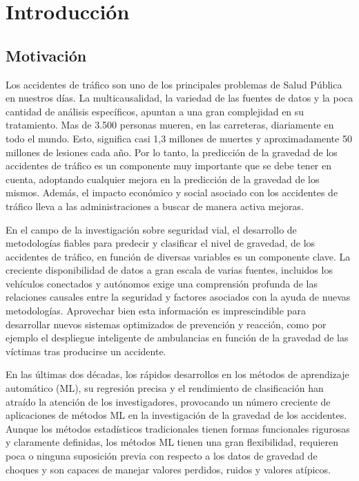 
\chapter{Introducción}

\section {Motivación}


	Los accidentes de tráﬁco son uno de los principales problemas de Salud Pública en nuestros días. La multicausalidad, la variedad de las fuentes de datos y la poca cantidad de análisis especíﬁcos, apuntan a una gran complejidad en su tratamiento. Mas de 3.500 personas mueren, en las carreteras, diariamente en todo el mundo. Esto, signiﬁca casi 1,3 millones de muertes y aproximadamente 50 millones de lesiones cada año. Por lo tanto, la predicción de la gravedad de los accidentes de tráﬁco es un componente muy importante que se debe tener en cuenta, adoptando cualquier mejora en la predicción de la gravedad de los mismos. Además, el impacto económico y social asociado con los accidentes de tráﬁco lleva a las administraciones a buscar de manera activa mejoras.

	En el campo de la investigación sobre seguridad vial, el desarrollo de metodologías ﬁables para predecir y clasiﬁcar el nivel de gravedad, de los accidentes de tráﬁco, en función de diversas variables es un componente clave. La creciente disponibilidad de datos a gran escala de varias fuentes, incluidos los vehículos conectados y autónomos exige una comprensión profunda de las relaciones causales entre la seguridad y factores asociados con la ayuda de nuevas metodologías. Aprovechar bien esta información es imprescindible para desarrollar nuevos sistemas optimizados de prevención y reacción, como por ejemplo el despliegue inteligente de ambulancias en función de la gravedad de las víctimas tras producirse un accidente.

	En las últimas dos décadas, los rápidos desarrollos en los métodos de aprendizaje automático (ML), su regresión precisa y el rendimiento de clasiﬁcación han atraído la atención de los investigadores, provocando un número creciente de aplicaciones de métodos ML en la investigación de la gravedad de los accidentes. Aunque los métodos estadísticos tradicionales tienen formas funcionales rigurosas y claramente deﬁnidas, los métodos ML tienen una gran ﬂexibilidad, requieren poca o ninguna suposición previa con respecto a los datos de gravedad de choques y son capaces de manejar valores perdidos, ruidos y valores atípicos.

